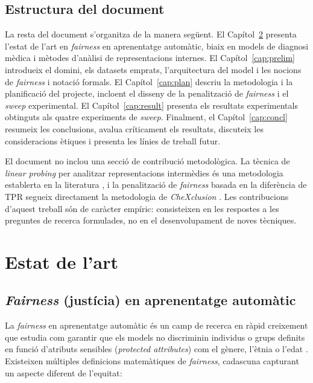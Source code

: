 \documentclass[a4paper,12pt,twoside]{ThesisStyle}
\begin{document}
\section{Estructura del document}

La resta del document s'organitza de la manera següent. El Capítol~\ref{cap:estat} presenta l'estat de l'art en \textit{fairness} en aprenentatge automàtic, biaix en models de diagnosi mèdica i mètodes d'anàlisi de representacions internes. El Capítol~\ref{cap:prelim} introdueix el domini, els datasets emprats, l'arquitectura del model i les nocions de \textit{fairness} i notació formals. El Capítol~\ref{cap:plan} descriu la metodologia i la planificació del projecte, incloent el disseny de la penalització de \textit{fairness} i el \textit{sweep} experimental. El Capítol~\ref{cap:result} presenta els resultats experimentals obtinguts als quatre experiments de \textit{sweep}. Finalment, el Capítol~\ref{cap:concl} resumeix les conclusions, avalua críticament els resultats, discuteix les consideracions ètiques i presenta les línies de treball futur.

El document no inclou una secció de contribució metodològica. La tècnica de \textit{linear probing} per analitzar representacions intermèdies és una metodologia establerta en la literatura \cite{Alain2016}, i la penalització de \textit{fairness} basada en la diferència de TPR segueix directament la metodologia de \textit{CheXclusion} \cite{SeyyedKalantari2021}. Les contribucions d'aquest treball són de caràcter empíric: consisteixen en les respostes a les preguntes de recerca formulades, no en el desenvolupament de noves tècniques.

\chapter{Estat de l'art}
\label{cap:estat}

\section{\textit{Fairness} (justícia) en aprenentatge automàtic}

La \textit{fairness} en aprenentatge automàtic és un camp de recerca en ràpid creixement que estudia com garantir que els models no discriminin individus o grups definits en funció d'atributs sensibles (\textit{protected attributes}) com el gènere, l'ètnia o l'edat \cite{Barocas2023}. Existeixen múltiples definicions matemàtiques de \textit{fairness}, cadascuna capturant un aspecte diferent de l'equitat:
\end{document}

